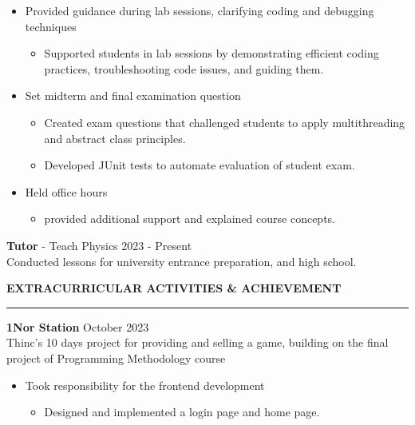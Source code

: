\documentclass[11pt]{article}
\begin{document}
\begin{itemize}[topsep=0pt, parsep=0pt]
    \item {Provided guidance during lab sessions, clarifying coding and debugging techniques}
    {\fontsize{10pt}{11pt}\selectfont
    \begin{itemize}[noitemsep, topsep=0pt, partopsep=0pt, parsep=0pt, leftmargin=*]
        \item Supported students in lab sessions by demonstrating efficient coding practices, troubleshooting code issues, and guiding them.
    \end{itemize}
    }
    \item {Set midterm and final examination question}
    {\fontsize{10pt}{11pt}\selectfont
    \begin{itemize}[noitemsep, topsep=0pt, partopsep=0pt, parsep=0pt, leftmargin=*]
        \item Created exam questions that challenged students to apply multithreading and abstract class principles.
        \item Developed JUnit tests to automate evaluation of student exam.
    \end{itemize}
    }
    \item {Held office hours}
    {\fontsize{10pt}{11pt}\selectfont
    \begin{itemize}[noitemsep, topsep=0pt, partopsep=0pt, parsep=0pt, leftmargin=*]
        \item provided additional support and explained course concepts.
    \end{itemize}
    }
    
\end{itemize}

\textbf{Tutor} - Teach Physics \hfill 2023 - Present\\
\hspace*{7pt} Conducted lessons for university entrance preparation, and high school.

\vspace{3pt}

\vspace{9pt}
\textbf{EXTRACURRICULAR ACTIVITIES \& ACHIEVEMENT}
\vspace{5pt}
{\color{NavyBlue}\hrule}
\vspace{6pt}

\textbf{1Nor Station} \hfill October 2023\\
{\footnotesize Thinc's 10 days project for providing and selling a game, building on the final project of Programming Methodology course}
\begin{itemize}[noitemsep, topsep=0pt, partopsep=0pt, parsep=0pt]
    \item {Took responsibility for the frontend development}
    {\fontsize{10pt}{11pt}\selectfont
    \begin{itemize}[noitemsep, topsep=0pt, partopsep=0pt, parsep=0pt, leftmargin=*]
        \item Designed and implemented a login page and home page.
    \end{itemize}
    }
\end{itemize}
\end{document}
